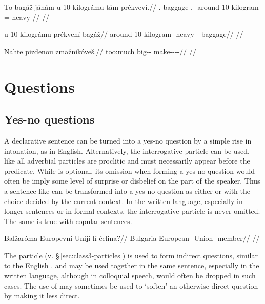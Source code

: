 \ex
\begingl
\gla To bagáž jánám u 10 kilográmu tám prékveví.//
\glb \Dem{}.\Prox{} baggage \Dem{}.\Med{}-\Agt{} around 10 kilogram-\Ins{} \Comp{}= heavy-\Cont{}//
\glft {}//
\endgl
\xe

\ex
\begingl
\gla u 10 kilográmu prékvení bagáž//
\glb around 10 kilogram-\Ins{} heavy-\Comp{}-\Att{} baggage//
\glft {}//
\endgl
\xe

\ex
\begingl
\gla Nahte pizdenou zmažnikóveš.//
\glb too:much big-\Comp{}-\Nz{} make-\Pv{}-\Pf{}-\Nz{}-\Second{}\Sg{}//
\glft {}//
\endgl
\xe

\section{Questions}\label{sec:questions-syntax}

\subsection{Yes-no questions}\label{sec:questions-yesno}

A declarative sentence can be turned into a yes-no question by a simple rise in
intonation, as in English. Alternatively, the interrogative particle 
can be used.  like all adverbial particles are proclitic and must
necessarily appear before the predicate. While  is optional, its
omission when forming a yes-no question would often be imply some level of
surprise or disbelief on the part of the speaker. Thus a sentence like
 can be transformed into a yes-no
question as either  or  with the choice decided by the current
context. In the written language, especially in longer sentences or in formal
contexts, the interrogative particle is never omitted. The same is true with
copular sentences.

\pex
\begingl
  \gla Balžaróma Europevní Unijí lí čelina?//
  \glb Bulgaria European-\Att{} Union-\Gen{} \Q{} member//
  \glft {}//
\endgl
\xe

The particle  (v. \S\,\ref{sec:class3-particles}) is used to form
indirect questions, similar to the English .  and
 may be used together in the same sentence, especially in the written
language, although in colloquial speech,  would often be dropped in such
cases. The use of  may sometimes be used to `soften' an otherwise
direct question by making it less direct.

